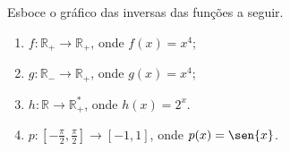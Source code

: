 \begin{frame}
  \begin{columns}[onlytextwidth]
    \begin{column}{0.6\textwidth}\vspace*{-0.55cm}
      \begin{example}
        Esboce o gráfico das inversas das funções a seguir.
      \end{example}
      \begin{enumerate}
        \item $f:\mathbb{R}_{+}\rightarrow \mathbb{R}_{+}$, onde $f(x) = x^{4}$;
        \item $g:\mathbb{R}_{-}\rightarrow \mathbb{R}_{+}$, onde $g(x) = x^{4}$;
        \item $h:\mathbb{R}\rightarrow \mathbb{R}^{*}_{+}$, onde $h(x) = 2^{x}$.
        \item $p:\left[-\frac{\pi}{2},\frac{\pi}{2}\right]\rightarrow [-1,1]$, onde $p(x) = \sen{x}$.
      \end{enumerate}
    \end{column}
    \begin{column}{0.4\textwidth}\vspace*{-0.55cm}
    \end{column}
  \end{columns}
\end{frame}

